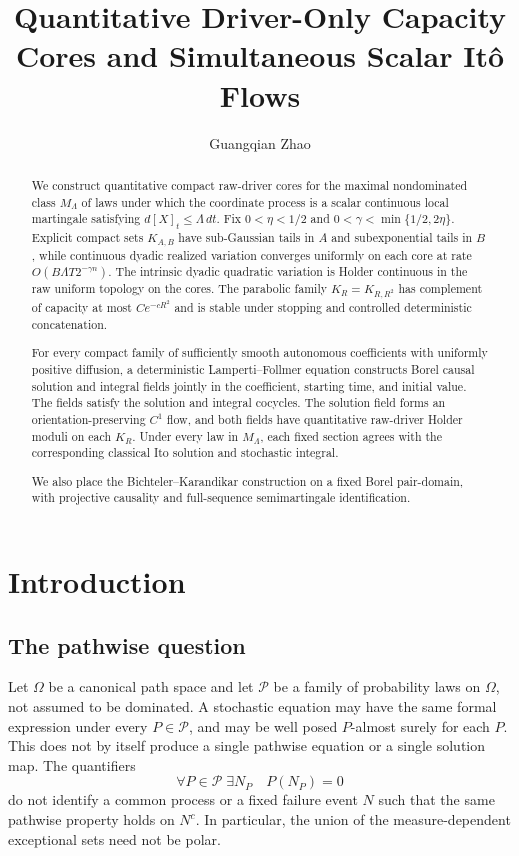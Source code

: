 \documentclass[11pt,reqno]{amsart}
\title[Quantitative driver-only capacity cores]
{Quantitative Driver-Only Capacity Cores and Simultaneous Scalar It\^o Flows}
\author{Guangqian Zhao}
\theoremstyle{plain}
\theoremstyle{definition}
\newcommand{\cP}{\mathcal P}
\begin{document}
\raggedbottom

\begin{abstract}
We construct quantitative compact raw-driver cores for the maximal nondominated class $M_\Lambda$ of laws under which the coordinate process is a scalar continuous local martingale satisfying $d[X]_t\leq\Lambda\,dt$. Fix $0<\eta<1/2$ and $0<\gamma<\min\{1/2,2\eta\}$. Explicit compact sets $K_{A,B}$ have sub-Gaussian tails in $A$ and subexponential tails in $B$, while continuous dyadic realized variation converges uniformly on each core at rate $O(B\Lambda T2^{-\gamma n})$. The intrinsic dyadic quadratic variation is Holder continuous in the raw uniform topology on the cores. The parabolic family $K_R=K_{R,R^2}$ has complement of capacity at most $Ce^{-cR^2}$ and is stable under stopping and controlled deterministic concatenation.

For every compact family of sufficiently smooth autonomous coefficients with uniformly positive diffusion, a deterministic Lamperti--Follmer equation constructs Borel causal solution and integral fields jointly in the coefficient, starting time, and initial value. The fields satisfy the solution and integral cocycles. The solution field forms an orientation-preserving $C^1$ flow, and both fields have quantitative raw-driver Holder moduli on each $K_R$. Under every law in $M_\Lambda$, each fixed section agrees with the corresponding classical Ito solution and stochastic integral.

We also place the Bichteler--Karandikar construction on a fixed Borel pair-domain, with projective causality and full-sequence semimartingale identification.
\end{abstract}

\maketitle

\section{Introduction}\label{sec:introduction}

\subsection{The pathwise question}

Let \(\Omega\) be a canonical path space and let \(\cP\) be a family of
probability laws on \(\Omega\), not assumed to be dominated.  A stochastic
equation may have the same formal expression under every \(P\in\cP\), and may
be well posed \(P\)-almost surely for each \(P\).  This does not by itself
produce a single pathwise equation or a single solution map.  The quantifiers
\[
  \forall P\in\cP\;\exists N_P\quad P(N_P)=0
\]
do not identify a common process or a fixed failure event \(N\) such that the
same pathwise property holds on \(N^c\).  In particular, the union of the
measure-dependent exceptional sets need not be polar.
\end{document}
